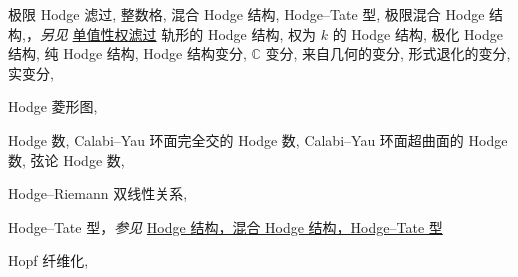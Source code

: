 \begin{theindex}
\subsubitem \leavevmode\hypertarget{idx:0596}{极限 Hodge 滤过},\enspace{}
\subitem \leavevmode\hypertarget{idx:0597}{整数格},\enspace{}
\subitem \leavevmode\hypertarget{idx:0598}{混合 Hodge 结构},\enspace{}
\subsubitem \leavevmode\hypertarget{idx:0599}{Hodge--Tate 型},\enspace{}
\subsubitem \leavevmode\hypertarget{idx:0600}{极限混合 Hodge 结构},\enspace{}，\textit{另见} \hyperlink{idx:0907}{单值性权滤过}
\subitem \leavevmode\hypertarget{idx:0601}{轨形的 Hodge 结构},\enspace{}
\subitem \leavevmode\hypertarget{source:483}{}\hypertarget{idx:0602}{权为 $k$ 的 Hodge 结构},\enspace{}
\subitem \leavevmode\hypertarget{idx:0603}{极化 Hodge 结构},\enspace{}
\subitem \leavevmode\hypertarget{idx:0604}{纯 Hodge 结构},\enspace{}
\subitem \leavevmode\hypertarget{idx:0605}{Hodge 结构变分},\enspace{}
\subsubitem \leavevmode\hypertarget{idx:0606}{$\mathbb C$ 变分},\enspace{}
\subsubitem \leavevmode\hypertarget{idx:0607}{来自几何的变分},\enspace{}
\subsubitem \leavevmode\hypertarget{idx:0608}{形式退化的变分},\enspace{}
\subsubitem \leavevmode\hypertarget{idx:0609}{实变分},\enspace{}
\indexspace
\item \leavevmode\hypertarget{idx:0588}{Hodge 菱形图},\enspace{}
\indexspace
\item \leavevmode\hypertarget{idx:0589}{Hodge 数},\enspace{}
\subitem \leavevmode\hypertarget{idx:0590}{Calabi--Yau 环面完全交的 Hodge 数},\enspace{}
\subitem \leavevmode\hypertarget{idx:0591}{Calabi--Yau 环面超曲面的 Hodge 数},\enspace{}
\subitem \leavevmode\hypertarget{idx:0592}{弦论 Hodge 数},\enspace{}
\indexspace
\item \leavevmode\hypertarget{idx:0610}{Hodge--Riemann 双线性关系},\enspace{}
\indexspace
\item \leavevmode\hypertarget{idx:0611}{Hodge--Tate 型}，\textit{参见} \hyperlink{idx:0599}{Hodge 结构，混合 Hodge 结构，Hodge--Tate 型}
\indexspace
\item \leavevmode\hypertarget{idx:0614}{Hopf 纤维化},\enspace{}

\end{theindex}
